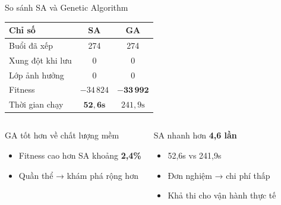 \documentclass[aspectratio=169,10pt]{beamer}
\begin{document}
\begin{frame}{So sánh SA và Genetic Algorithm}
\begin{table}
\centering
\begin{tabular}{@{}lcc@{}}
\toprule
\textbf{Chỉ số} & \textbf{SA} & \textbf{GA} \\
\midrule
Buổi đã xếp & 274 & 274 \\
Xung đột khi lưu & 0 & 0 \\
Lớp ảnh hưởng & 0 & 0 \\
Fitness & $-34\,824$ & $\mathbf{-33\,992}$ \\
Thời gian chạy & $\mathbf{52{,}6\text{s}}$ & $241{,}9\text{s}$ \\
\bottomrule
\end{tabular}
\end{table}

\vspace{0.4cm}
\begin{columns}[T]
\begin{block}{GA tốt hơn về chất lượng mềm}
\begin{itemize}
  \item Fitness cao hơn SA khoảng \textbf{2,4\%}
  \item Quần thể → khám phá rộng hơn
\end{itemize}
\end{block}

\begin{alertblock}{SA nhanh hơn \textbf{4,6 lần}}
\begin{itemize}
  \item 52,6s vs 241,9s
  \item Đơn nghiệm → chi phí thấp
  \item Khả thi cho vận hành thực tế
\end{itemize}
\end{alertblock}
\end{columns}
\end{frame}
\end{document}
